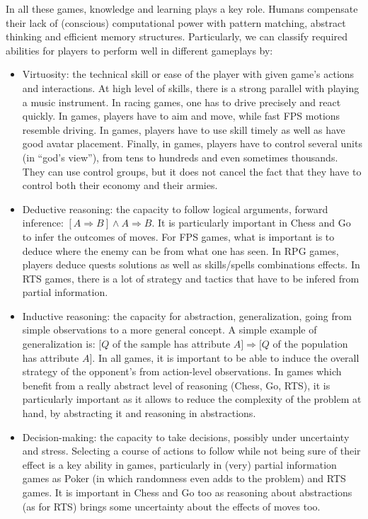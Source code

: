 In all these games, knowledge and learning plays a key role. Humans compensate their lack of (conscious) computational power with pattern matching, abstract thinking and efficient memory structures. Particularly, we can classify required abilities for players to perform well in different gameplays by:
\begin{itemize}
    \item Virtuosity: the technical skill or ease of the player with given game's actions and interactions. At high level of skills, there is a strong parallel with playing a music instrument. In racing games, one has to drive precisely and react quickly. In  games, players have to aim and move, while fast FPS motions resemble driving. In  games, players have to use skill timely as well as have good avatar placement. Finally, in  games, players have to control several units (in ``god's view''), from tens to hundreds and even sometimes thousands. They can use control groups, but it does not cancel the fact that they have to control both their economy and their armies.
    \item Deductive reasoning: the capacity to follow logical arguments, forward inference: $[A \Rightarrow B] \wedge A \Rightarrow B$. It is particularly important in Chess and Go to infer the outcomes of moves. For FPS games, what is important is to deduce where the enemy can be from what one has seen. In RPG games, players deduce quests solutions as well as skills/spells combinations effects. In RTS games, there is a lot of strategy and tactics that have to be infered from partial information.
    \item Inductive reasoning: the capacity for abstraction, generalization, going from simple observations to a more general concept. A simple example of generalization is: $[Q$ of the sample has attribute $A] \Rightarrow [Q$ of the population has attribute $A]$. In all games, it is important to be able to induce the overall strategy of the opponent's from action-level observations. In games which benefit from a really abstract level of reasoning (Chess, Go, RTS), it is particularly important as it allows to reduce the complexity of the problem at hand, by abstracting it and reasoning in abstractions.
    \item Decision-making: the capacity to take decisions, possibly under uncertainty and stress. Selecting a course of actions to follow while not being sure of their effect is a key ability in games, particularly in (very) partial information games as Poker (in which randomness even adds to the problem) and RTS games. It is important in Chess and Go too as reasoning about abstractions (as for RTS) brings some uncertainty about the effects of moves too.

\end{itemize}
